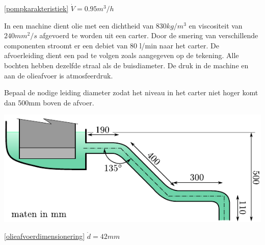 \begin{antwoord}{\ref{pompkarakteristiek}}
	$\dot{V} = 0.95\unit{m^3/h}$
\end{antwoord}
\begin{toepassing}[*]
	\label{olieafvoerdimensionering}
In een machine dient olie met een dichtheid van $830\unit{kg/m^3}$ en viscositeit van $240\unit{mm^2/s}$ afgevoerd te worden uit een carter. Door de smering van verschillende componenten stroomt er een debiet van 80 l/min naar het carter. De afvoerleiding dient een pad te volgen zoals aangegeven op de tekening. Alle bochten hebben dezelfde straal als de buisdiameter. De druk in de machine en aan de olieafvoer is atmosfeerdruk.
	
Bepaal de nodige leiding diameter zodat het niveau in het carter niet hoger komt dan 500mm boven de afvoer.

	\centering
	\includegraphics{fig/stroming_in_leidingen/olieafvoerdimensionering}
\end{toepassing}
\begin{antwoord}{\ref{olieafvoerdimensionering}}
	$\dot{d} = 42\unit{mm}$
\end{antwoord}
